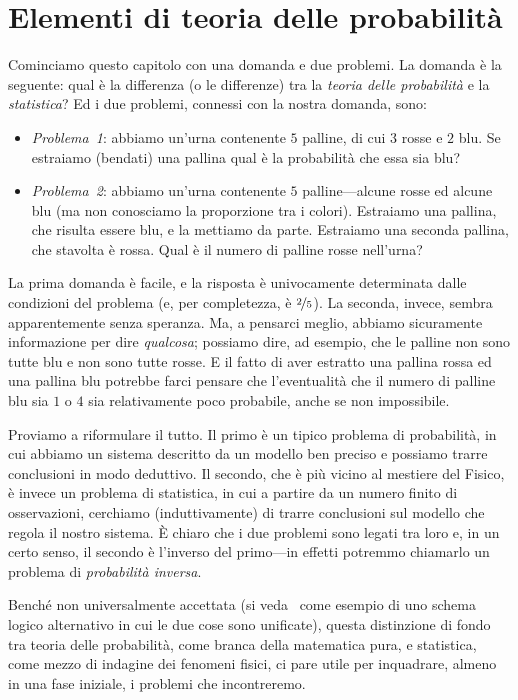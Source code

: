 \chapter{Elementi di teoria delle probabilità}
\label{sec:probabilita}

Cominciamo questo capitolo con una domanda e due problemi. La domanda è la
seguente: qual è la differenza (o le differenze) tra la
\emph{teoria delle probabilità} e la \emph{statistica}? Ed i due problemi,
connessi con la nostra domanda, sono:
\begin{itemize}\label{item:due problemi}
\item \emph{Problema~1}: abbiamo un'urna contenente $5$ palline, di cui $3$
  rosse e $2$ blu. Se estraiamo (bendati) una pallina qual è la probabilità
  che essa sia blu?
\item \emph{Problema~2}: abbiamo un'urna contenente $5$ palline---alcune rosse
  ed alcune blu (ma non conosciamo la proporzione tra i colori). Estraiamo una
  pallina, che risulta essere blu, e la mettiamo da parte. Estraiamo una
  seconda pallina, che stavolta è rossa. Qual è il numero di palline rosse
  nell'urna?
\end{itemize}

La prima domanda è facile, e la risposta è univocamente determinata dalle
condizioni del problema (e, per completezza, è $\nicefrac{2}{5}$). La seconda,
invece, sembra apparentemente senza speranza. Ma, a pensarci meglio, abbiamo
sicuramente informazione per dire \emph{qualcosa}; possiamo dire, ad esempio,
che le palline non sono tutte blu e non sono tutte rosse. E il fatto di aver
estratto una pallina rossa ed una pallina blu potrebbe farci pensare che
l'eventualità che il numero di palline blu sia $1$ o $4$ sia relativamente
poco probabile, anche se non impossibile.

Proviamo a riformulare il tutto. Il primo è un tipico problema di probabilità,
in cui abbiamo un sistema descritto da un modello ben preciso e possiamo trarre
conclusioni in modo deduttivo. Il secondo, che è più vicino al mestiere
del Fisico, è invece un problema di statistica, in cui a partire da un numero
finito di osservazioni, cerchiamo (induttivamente) di trarre conclusioni sul
modello che regola il nostro sistema. \`E chiaro che i due problemi sono legati
tra loro e, in un certo senso, il secondo è l'inverso del primo---in effetti
potremmo chiamarlo un problema di \emph{probabilità inversa}.

Benché non universalmente accettata (si veda~\cite{janes} come esempio di
uno schema logico alternativo in cui le due cose sono unificate), questa
distinzione di fondo tra teoria delle probabilità, come branca della
matematica pura, e statistica, come mezzo di indagine dei fenomeni fisici,
ci pare utile per inquadrare, almeno in una fase iniziale, i problemi che
incontreremo.


